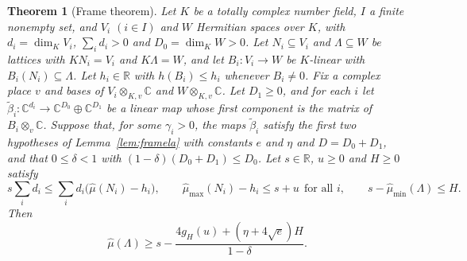 \documentclass[11pt]{amsart}
\newcommand{\CC}{\mathbb{C}}
\newcommand{\R}{\mathbb{R}}
\theoremstyle{plain}
\newtheorem{theorem}{Theorem}[section]
\theoremstyle{definition}
\numberwithin{equation}{section}
\begin{document}
\begin{theorem}[Frame theorem]\label{thm:F}
Let $K$ be a totally complex number field, $I$ a finite nonempty set, and $V_i$ $(i\in I)$ and $W$
Hermitian spaces over $K$, with $d_i=\dim_KV_i$, $\sum_id_i>0$ and $D_0=\dim_KW>0$. Let $N_i\subseteq V_i$
and $\Lambda\subseteq W$ be lattices with $KN_i=V_i$ and $K\Lambda=W$, and let $B_i:V_i\to W$ be
$K$-linear with $B_i(N_i)\subseteq\Lambda$. Let $h_i\in\R$ with $h(B_i)\le h_i$ whenever $B_i\ne0$. Fix
a complex place $v$ and bases of $V_i\otimes_{K,v}\CC$ and $W\otimes_{K,v}\CC$. Let $D_1\ge0$, and for
each $i$ let $\tilde\beta_i:\CC^{d_i}\to\CC^{D_0}\oplus\CC^{D_1}$ be a linear map whose first
component is the matrix of $B_i\otimes_v\CC$. Suppose that, for some $\gamma_i>0$, the maps
$\tilde\beta_i$ satisfy the first two hypotheses of Lemma~\ref{lem:framela} with constants $e$ and
$\eta$ and $D=D_0+D_1$, and that $0\le\delta<1$ with $(1-\delta)(D_0+D_1)\le D_0$. Let $s\in\R$, $u\ge0$ and $H\ge0$
satisfy
\[
s\sum_id_i\le\sum_id_i\bigl(\hat\mu(N_i)-h_i\bigr),\qquad
\hat\mu_{\max}(N_i)-h_i\le s+u\ \ \text{for all }i,\qquad
s-\hat\mu_{\min}(\Lambda)\le H.
\]
Then
\[
\hat\mu(\Lambda)\ge s-\frac{4g_H(u)+(\eta+4\sqrt e)H}{1-\delta}.
\]
\end{theorem}
\end{document}
